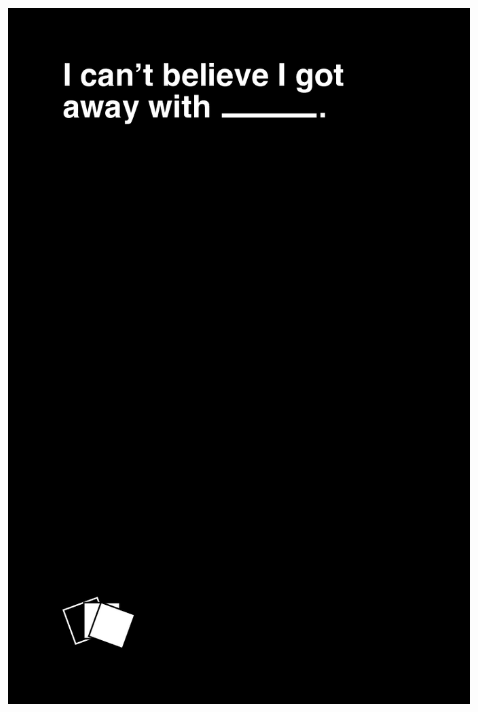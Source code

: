 \documentclass{beamer}
\begin{document}
\begin{frame}


\begin{columns}
	\begin{column}[t]{0.1\textwidth}
	\end{column}
	\begin{column}[t]{0.3\textwidth}
		\includegraphics[width=.9\textwidth]{../zksummit/black_FRONT012.png} %
	\end{column}
	\begin{column}[t]{0.3\textwidth}

\end{column}
\end{columns}
\end{frame}
\end{document}
